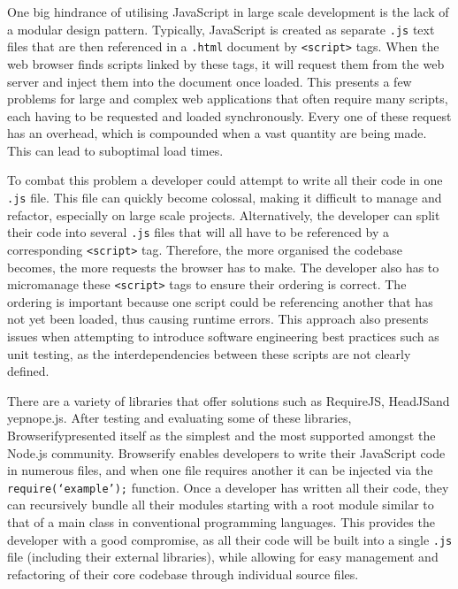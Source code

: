 \documentclass[final]{cmpreport}
\begin{document}
One big hindrance of utilising JavaScript in large scale development is the lack of a modular design pattern. Typically, JavaScript is created as separate \texttt{.js} text files that are then referenced in a \texttt{.html} document by \texttt{<script>} tags. When the web browser finds scripts linked by these tags, it will request them from the web server and inject them into the document once loaded. This presents a few problems for large and complex web applications that often require many scripts, each having to be requested and loaded synchronously. Every one of these request has an overhead, which is compounded when a vast quantity are being made. This can lead to suboptimal load times.

To combat this problem a developer could attempt to write all their code in one \texttt{.js} file. This file can quickly become colossal, making it difficult to manage and refactor, especially on large scale projects. Alternatively, the developer can split their code into several \texttt{.js} files that will all have to be referenced by a corresponding \texttt{<script>} tag. Therefore, the more organised the codebase becomes, the more requests the browser has to make. The developer also has to micromanage these \texttt{<script>} tags to ensure their ordering is correct. The ordering is important because one script could be referencing another that has not yet been loaded, thus causing runtime errors. This approach also presents issues when attempting to introduce software engineering best practices such as unit testing, as the interdependencies between these scripts are not clearly defined.

There are a variety of libraries that offer solutions such as RequireJS\footnotemark[7], HeadJS\footnotemark[8] and yepnope.js\footnotemark[9]. After testing and evaluating some of these libraries, Browserify\footnotemark[10] presented itself as the simplest and the most supported amongst the Node.js community. Browserify enables developers to write their JavaScript code in numerous files, and when one file requires another it can be injected via the \texttt{require(`example');} function. Once a developer has written all their code, they can recursively bundle all their modules starting with a root module similar to that of a main class in conventional programming languages. This provides the developer with a good compromise, as all their code will be built into a single \texttt{.js} file (including their external libraries), while allowing for easy management and refactoring of their core codebase through individual source files.
\end{document}
